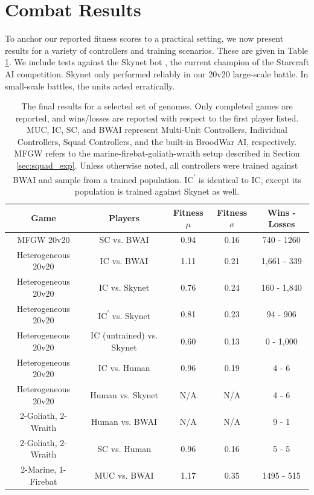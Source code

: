 \documentclass[10pt,a4paper,twocolumn]{article}
\begin{document}
\section{Combat Results}

To anchor our reported fitness scores to a practical setting, we now present results for a variety of controllers and training scenarios. These are given in Table \ref{tab:results}. We include tests against the Skynet bot \cite{skynet}, the current champion of the Starcraft AI competition. Skynet only performed reliably in our 20v20 large-scale battle. In small-scale battles, the units acted erratically.

\begin{table}
\centering
\begin{tabular}{|c|c|c|c|c|}
	\hline
	{\bf Game} & {\bf Players } & {\bf Fitness $\mu$} & {\bf Fitness $\sigma$} & {\bf Wins - Losses } \\ \hline
	MFGW 20v20 & SC vs. BWAI & 0.94 & 0.16 & 740 - 1260 \\ \hline
	Heterogeneous 20v20 & IC vs. BWAI & 1.11 & 0.21 & 1,661 - 339\\ \hline
	Heterogeneous 20v20 & IC vs. Skynet & 0.76 & 0.24 &  160 - 1,840 \\ \hline
	Heterogeneous 20v20 & IC\textsuperscript{$\prime$} vs. Skynet & 0.81 & 0.23 & 94 - 906 \\ \hline
	Heterogeneous 20v20 & IC (untrained) vs. Skynet & 0.60 & 0.13 & 0 - 1,000 \\ \hline
	Heterogeneous 20v20 & IC vs. Human & 0.96 & 0.19 & 4 - 6 \\ \hline
	Heterogeneous 20v20 & Human vs. Skynet & N/A & N/A & 4 - 6 \\ \hline
	2-Goliath, 2-Wraith & Human vs. BWAI & N/A & N/A & 9 - 1\\ \hline
	2-Goliath, 2-Wraith & SC vs. Human & 0.96 & 0.16 & 5 - 5 \\ \hline
	2-Marine, 1-Firebat & MUC vs. BWAI & 1.17 & 0.35 & 1495 - 515 \\ \hline
\end{tabular}
\caption{The final results for a selected set of genomes. Only completed games are reported, and wins/losses are reported with respect to the first player listed. MUC, IC, SC, and BWAI represent Multi-Unit Controllers, Individual Controllers, Squad Controllers, and the built-in BroodWar AI, respectively. MFGW refers to the marine-firebat-goliath-wraith setup described in Section \ref{sec:squad_exp}. Unless otherwise noted, all controllers were trained against BWAI and sample from a trained population. IC\textsuperscript{$\prime$} is identical to IC, except its population is trained against Skynet as well.}
\label{tab:results}
\end{table}
\end{document}
